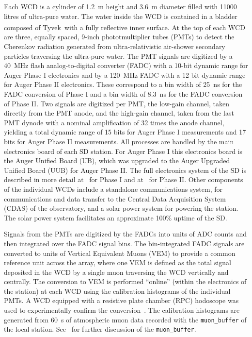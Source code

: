 Each WCD is a cylinder of \qty{1.2}{\meter} height and \qty{3.6}{\meter} diameter filled with 11000 litres of ultra-pure water.
The water inside the WCD is contained in a bladder composed of Tyvek\textsuperscript{\textregistered}~with a fully reflective inner surface.
At the top of each WCD are three, equally spaced, 9-inch phototmultiplier tubes (PMTs) to detect the Cherenkov radiation generated from ultra-relativistic air-shower secondary particles traversing the ultra-pure water.
The PMT signals are digitized by a \qty{40}{\mega\hertz} flash analog-to-digital converter (FADC) with a 10-bit dynamic range for Auger Phase I electronics and by a \qty{120}{\mega\hertz} FADC with a 12-bit dynamic range for Auger Phase II electronics.
These correspond to a bin width of \qty{25}{\nano\second} for the FADC conversion of Phase I and a bin width of \qty{8.3}{\nano\second} for the FADC conversion of Phase II.
Two signals are digitized per PMT, the low-gain channel, taken directly from the PMT anode, and the high-gain channel, taken from the last PMT dynode with a nominal amplification of 32 times the anode channel, yielding a total dynamic range of 15 bits for Auger Phase I measurements and 17 bits for Auger Phase II measurements.
All processes are handled by the main electronics board of each SD station.
For Auger Phase I this electronics board is the Auger Unified Board (UB), which was upgraded to the Auger Upgraded Unified Board (UUB) for Auger Phase II.
The full electronics system of the SD is described in more detail at~\cite{auger_nima2015_paper} for Phase I and at~\cite{auger_jinst2023_sdeu} for Phase II.
Other components of the individual WCDs include a standalone communications system, for communications and data transfer to the Central Data Acquisition System (CDAS) of the observatory, and a solar power system for powering the station.
The solar power system facilitates an approximate 100\% uptime of the SD.

Signals from the PMTs are digitized by the FADCs into units of ADC counts and then integrated over the FADC signal bins.
The bin-integrated FADC signals are converted to units of Vertical Equivalent Muons (VEM) to provide a common reference unit across the array, where one VEM is defined as the total signal deposited in the WCD by a single muon traversing the WCD vertically and centrally.
The conversion to VEM is performed ``online'' (within the electronics of the station) at each WCD using the calibration histograms of the individual PMTs.
A WCD equipped with a resistive plate chamber (RPC) hodoscope was used to experimentally confirm the conversion~\cite{auger_jinst2020_hodoscope}.
The calibration histograms are generated from \qty{60}{\second} of atmospheric muon data recorded with the \texttt{muon\_buffer} of the local station.
See~ for further discussion of the \texttt{muon\_buffer}.

